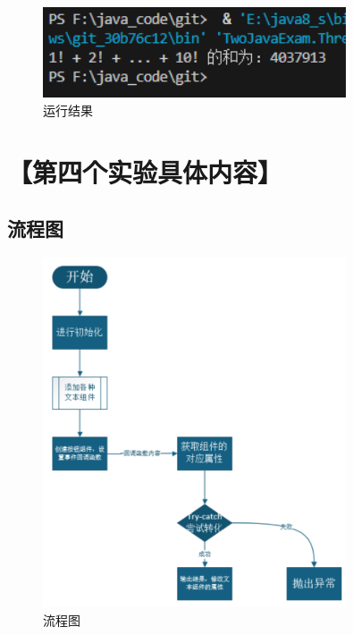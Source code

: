 \documentclass[12pt,a4paper]{article}
\begin{document}
\begin{figure}[H]
\centering
\includegraphics[width=0.8\textwidth]{three.png}
\caption{运行结果}
\end{figure}

\section*{【第四个实验具体内容】}
\subsection*{流程图}

\begin{figure}[H]
\centering
\includegraphics[width=0.8\textwidth]{four1.png}
\caption{流程图}
\end{figure}
\end{document}
